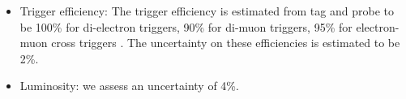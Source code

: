 \begin{itemize}
\item Trigger efficiency: 
  The trigger efficiency is estimated from tag and probe to be 
  100\% for di-electron triggers,
  90\% for di-muon triggers,
  95\% for electron-muon cross triggers \cite{ref:smurfww}. 
  The uncertainty on these efficiencies is estimated to be 2\%.

\item Luminosity: we assess an uncertainty of 4\%. 

\end{itemize}







%



